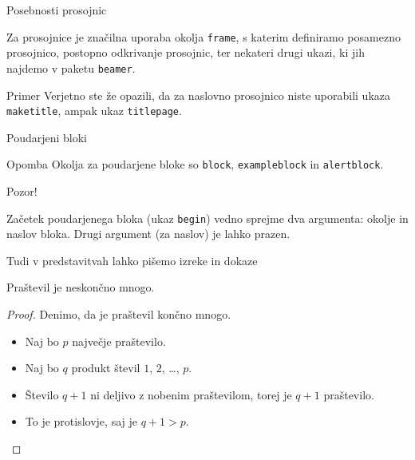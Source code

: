 \begin{frame}{Posebnosti prosojnic}

	Za prosojnice je značilna uporaba okolja \texttt{frame},
	s katerim definiramo posamezno prosojnico,
	\pause
	postopno odkrivanje prosojnic,
	\pause
	ter nekateri drugi ukazi, ki jih najdemo v paketu \texttt{beamer}.
	\pause
	\begin{exampleblock}{Primer}
		Verjetno ste že opazili, da za naslovno prosojnico niste uporabili
		ukaza \texttt{maketitle}, ampak ukaz \texttt{titlepage}.
	\end{exampleblock}
\end{frame}

\begin{frame}{Poudarjeni bloki}

		\begin{block}{Opomba}
		Okolja za poudarjene bloke so \texttt{block}, \texttt{exampleblock} in \texttt{alertblock}.
		\end{block}
		
		\begin{alertblock}{Pozor!}	
		\end{alertblock}
		Začetek poudarjenega bloka (ukaz \texttt{begin}) vedno sprejme 
		dva argumenta: okolje in naslov bloka.
		Drugi argument (za naslov) je lahko prazen. 

\end{frame}

\begin{frame}{Tudi v predstavitvah lahko pišemo izreke in dokaze}

	\begin{izrek}
	   Praštevil je neskončno mnogo.
	\end{izrek}
	\begin{proof}
	   Denimo, da je praštevil končno mnogo.
	   \begin{itemize}[<+->]
		  \item Naj bo \(p\) \alert{največje} praštevilo.
		  \item Naj bo \(q\) produkt števil \(1\), \(2\), \ldots, \(p\).
		  \item Število \(q+1\) ni deljivo z nobenim praštevilom, torej je \(q+1\) praštevilo.
		  \item To je protislovje, saj je \(q+1>p\). \qedhere
	   \end{itemize}
	\end{proof}
 \end{frame}
 
